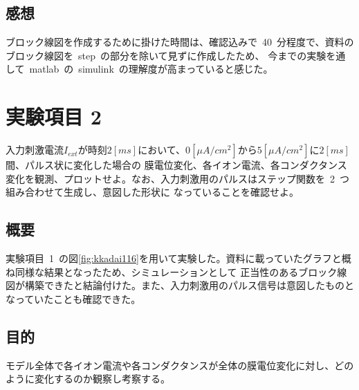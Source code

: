 \documentclass[10pt]{jarticle}
\begin{document}
\subsection{感想}
%
ブロック線図を作成するために掛けた時間は、確認込みで\ 40\ 分程度で、資料のブロック線図を\ step\ の部分を除いて見ずに作成したため、
今までの実験を通して\ matlab\ の\ simulink\ の理解度が高まっていると感じた。
%

\section{実験項目 2 }
入力刺激電流$ I_{ext} $が時刻$ 2[ms] $において、$ 0[\mu A / cm^2] $から$ 5[\mu A / cm^2] $に$ 2[ms] $間、パルス状に変化した場合の
膜電位変化、各イオン電流、各コンダクタンス変化を観測、プロットせよ。なお、入力刺激用のパルスはステップ関数を\ 2\ つ組み合わせて生成し、意図した形状に
なっていることを確認せよ。

\subsection{概要}
%
実験項目\ 1\ の図\ref{fig:kkadai116}を用いて実験した。資料に載っていたグラフと概ね同様な結果となったため、シミュレーションとして
正当性のあるブロック線図が構築できたと結論付けた。また、入力刺激用のパルス信号は意図したものとなっていたことも確認できた。
%

\subsection{目的}
%
モデル全体で各イオン電流や各コンダクタンスが全体の膜電位変化に対し、どのように変化するのか観察し考察する。
%
\end{document}
